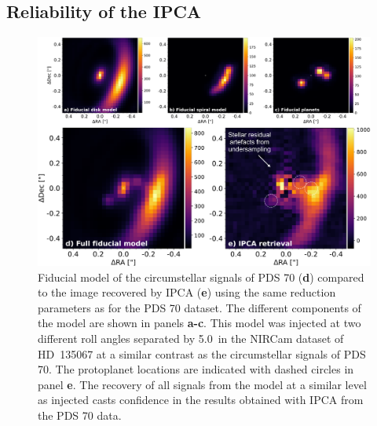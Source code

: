 \documentclass[longauth]{aa}
\newcommand{\vc}[1]{#1}
\newcommand{\new}[1]{#1}
\begin{document}
\begin{appendix}

\subsection{Reliability of the IPCA}\label{sec:TestIPCA}

    \begin{figure}[h]
    \centering
    \includegraphics[width=\textwidth]{FigA3.pdf}
    \caption{\new{Fiducial model of the circumstellar signals of PDS 70 ({\bf d}) compared to the image recovered by IPCA ({\bf e}) using the same reduction parameters as for the PDS 70 dataset. The different components of the model are shown in panels {\bf a-c}. This model was injected at two different roll angles separated by 5.0~\degr in the NIRCam dataset of HD~135067 at a similar contrast as the circumstellar signals of PDS 70. \vc{The protoplanet locations are indicated with dashed circles in panel {\bf e}}.}
    \vc{The recovery of all signals from the model at a similar level as injected casts confidence in the results obtained with IPCA from the PDS 70 data. %
    }}
    \label{fig:REF_test}
    \end{figure}
    

\end{appendix}
\end{document}
